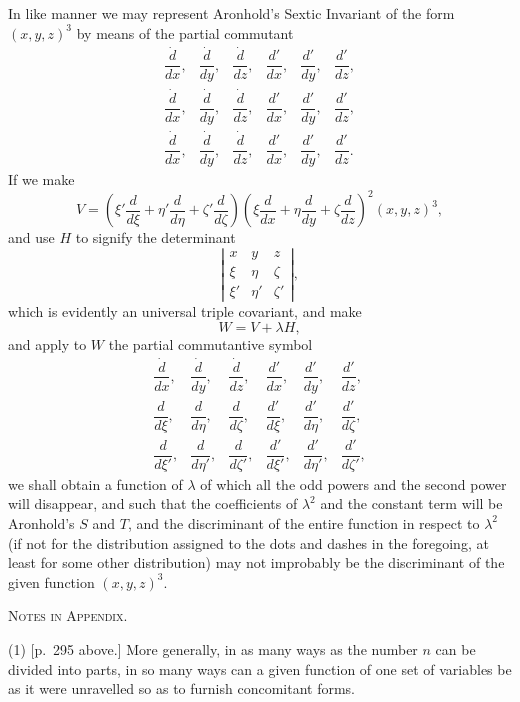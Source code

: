 \documentclass[11pt]{article}
\newcommand{\sourcepage}[1]{\marginpar{\scriptsize p.~#1}}
\begin{document}
{{\sourcepage{321}
In like manner we may represent Aronhold's Sextic Invariant of the form $(x,y,z)^3$ by means of the partial commutant
\[
\begin{array}{cccccc}
\dfrac{\dot d}{dx},&\dfrac{\dot d}{dy},&\dfrac{\dot d}{dz},&
\dfrac{d'}{dx},&\dfrac{d'}{dy},&\dfrac{d'}{dz},\\[0.7em]
\dfrac{\dot d}{dx},&\dfrac{\dot d}{dy},&\dfrac{\dot d}{dz},&
\dfrac{d'}{dx},&\dfrac{d'}{dy},&\dfrac{d'}{dz},\\[0.7em]
\dfrac{\dot d}{dx},&\dfrac{\dot d}{dy},&\dfrac{\dot d}{dz},&
\dfrac{d'}{dx},&\dfrac{d'}{dy},&\dfrac{d'}{dz}.
\end{array}
\]
If we make
\[
V=\left(\xi'\frac{d}{d\xi}+\eta'\frac{d}{d\eta}+\zeta'\frac{d}{d\zeta}\right)
\left(\xi\frac{d}{dx}+\eta\frac{d}{dy}+\zeta\frac{d}{dz}\right)^2(x,y,z)^3,
\]
and use $H$ to signify the determinant
\[
\left|\begin{array}{ccc}
x&y&z\\
\xi&\eta&\zeta\\
\xi'&\eta'&\zeta'
\end{array}\right|,
\]
which is evidently an universal triple covariant, and make
\[
W=V+\lambda H,
\]
and apply to $W$ the partial commutantive symbol
\[
\begin{array}{cccccc}
\dfrac{\dot d}{dx},&\dfrac{\dot d}{dy},&\dfrac{\dot d}{dz},&
\dfrac{d'}{dx},&\dfrac{d'}{dy},&\dfrac{d'}{dz},\\[0.7em]
\dfrac{d}{d\xi},&\dfrac{d}{d\eta},&\dfrac{d}{d\zeta},&
\dfrac{d'}{d\xi},&\dfrac{d'}{d\eta},&\dfrac{d'}{d\zeta},\\[0.7em]
\dfrac{d}{d\xi'},&\dfrac{d}{d\eta'},&\dfrac{d}{d\zeta'},&
\dfrac{d'}{d\xi'},&\dfrac{d'}{d\eta'},&\dfrac{d'}{d\zeta'},
\end{array}
\]
we shall obtain a function of $\lambda$ of which all the odd powers and the second power will disappear, and such that the coefficients of $\lambda^2$ and the constant term will be Aronhold's $S$ and $T$, and the discriminant of the entire function in respect to $\lambda^2$ (if not for the distribution assigned to the dots and dashes in the foregoing, at least for some other distribution) may not improbably be the discriminant of the given function $(x,y,z)^3$.

\sourcepage{322}
\begin{center}
{\scshape Notes in Appendix.}
\end{center}

(1) [p.~295 above.] More generally, in as many ways as the number $n$ can be divided into parts, in so many ways can a given function of one set of variables be as it were unravelled so as to furnish concomitant forms.

}}
\end{document}
